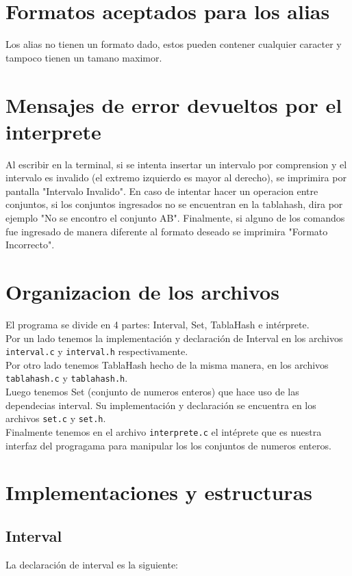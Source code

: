 \documentclass[]{article}
\begin{document}
\section{Formatos aceptados para los alias}
Los alias no tienen un formato dado, estos pueden contener cualquier caracter y tampoco tienen un tamano maximor.

\section{Mensajes de error devueltos por el interprete}
Al escribir en la terminal, si se intenta insertar un intervalo por comprension y el intervalo es invalido (el extremo izquierdo es mayor al derecho), se imprimira por pantalla "Intervalo Invalido". En caso de intentar hacer un operacion entre conjuntos, si los conjuntos ingresados no se encuentran en la tablahash, dira por ejemplo "No se encontro el conjunto AB". Finalmente, si alguno de los comandos fue ingresado de manera diferente al formato deseado se imprimira "Formato Incorrecto".

\section{Organizacion de los archivos}
El programa se divide en 4 partes: Interval, Set, TablaHash e intérprete.\\
Por un lado tenemos la implementación y declaración de Interval en los archivos \verb|interval.c| y \verb|interval.h| respectivamente.\\
Por otro lado tenemos TablaHash hecho de la misma manera, en los archivos \verb|tablahash.c| y \verb|tablahash.h|.\\
Luego tenemos Set (conjunto de numeros enteros) que hace uso de las dependecias interval. Su implementación y declaración se encuentra en los archivos \verb|set.c| y \verb|set.h|.\\
Finalmente tenemos en el archivo \verb|interprete.c| el intéprete que es nuestra interfaz del progragama para manipular los los conjuntos de numeros enteros.

\section{Implementaciones y estructuras}
\subsection{Interval}
La declaración de interval es la siguiente:
\end{document}
